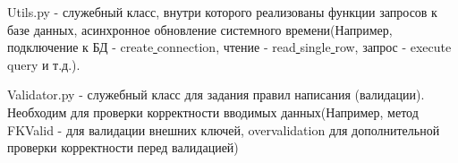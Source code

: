 Utils.py - служебный класс, внутри которого реализованы функции запросов к базе данных, асинхронное обновление системного времени(Например, подключение к БД - create\underline{ }connection, чтение - read\underline{ }single\underline{ }row, запрос - execute\underline{ }query и т.д.).

Validator.py - служебный класс для задания правил написания (валидации). Необходим для проверки корректности вводимых данных(Например, метод FKValid - для валидации внешних ключей, overvalidation для дополнительной проверки корректности перед валидацией)